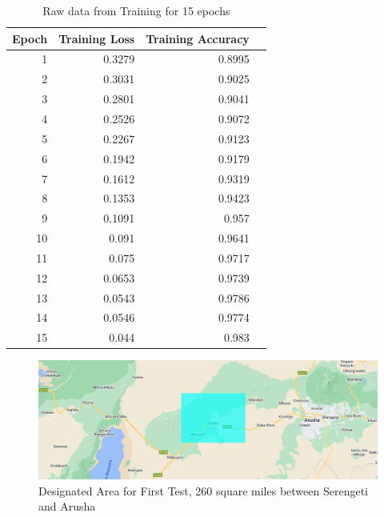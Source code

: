 \documentclass{article}
\begin{document}
\begin{table}[H]
    \centering
    \begin{tabular}{rrrl}
    \multicolumn{1}{c}{\textbf{Epoch}} & \multicolumn{1}{c}{\textbf{Training Loss}} & \multicolumn{1}{c}{\textbf{Training Accuracy}} &  \\ \toprule
    1  & 0.3279 & 0.8995 &  \\
    2  & 0.3031 & 0.9025 &  \\
    3  & 0.2801 & 0.9041 &  \\
    4  & 0.2526 & 0.9072 &  \\
    5  & 0.2267 & 0.9123 &  \\
    6  & 0.1942 & 0.9179 &  \\
    7  & 0.1612 & 0.9319 &  \\
    8  & 0.1353 & 0.9423 &  \\
    9  & 0.1091 & 0.957  &  \\
    10 & 0.091  & 0.9641 &  \\
    11 & 0.075  & 0.9717 &  \\
    12 & 0.0653 & 0.9739 &  \\
    13 & 0.0543 & 0.9786 &  \\
    14 & 0.0546 & 0.9774 &  \\
    15 & 0.044  & 0.983  &  \\ \bottomrule
    \end{tabular}
    \caption{Raw data from Training for 15 epochs}
    \label{tab:training_raw_data}
\end{table}


\begin{figure}[H]
    \centering
    \includegraphics[width=1\linewidth]{images/studyarea.png}
    \caption{Designated Area for First Test, 260 square miles between Serengeti and Arusha}
    \label{fig:designated_area}
\end{figure}
\end{document}
